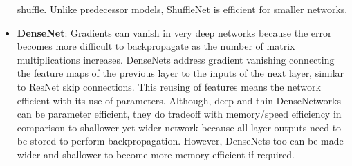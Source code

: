 \begin{itemize}
          shuffle. Unlike predecessor models, ShuffleNet is efficient for smaller
          networks.
    \item \textbf{DenseNet}: Gradients can vanish in very deep networks because
          the error becomes more difficult to backpropagate as the number of
          matrix multiplications increases. DenseNets address gradient vanishing
          connecting the feature maps of the previous layer to the inputs of the
          next layer, similar to ResNet skip connections. This reusing of features
          means the network efficient with its use of parameters. Although, deep
          and thin DenseNetworks can be parameter efficient, they do tradeoff
          with memory/speed efficiency in comparison to shallower yet wider network
          because all layer outputs need to be stored to perform backpropagation.
          However, DenseNets too can be made wider and shallower to become more
          memory efficient if required.
\end{itemize}